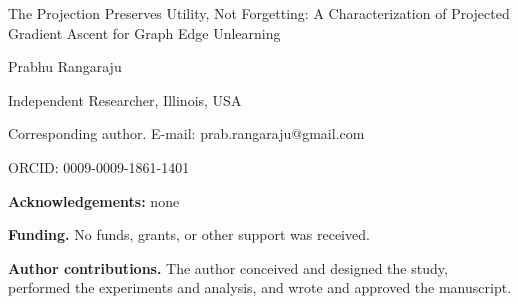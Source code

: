 \documentclass[11pt]{article}
\begin{document}
\begin{center}
{\LARGE The Projection Preserves Utility, Not Forgetting: A Characterization of Projected Gradient Ascent for Graph Edge Unlearning\par}
\vspace{12mm}
{\large Prabhu Rangaraju\par}
\vspace{3mm}
Independent Researcher, Illinois, USA\par
\vspace{3mm}
Corresponding author. E-mail: prab.rangaraju@gmail.com\par
\vspace{3mm}
ORCID: 0009-0009-1861-1401\par
\end{center}
\vspace{8mm}
\noindent\textbf{Acknowledgements:} none

\noindent\textbf{Funding.} No funds, grants, or other support was received.

\noindent\textbf{Author contributions.} The author conceived and designed the study, performed the experiments and analysis, and wrote and approved the manuscript.
\end{document}
